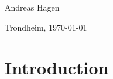 \documentclass[a4paper]{book}
\newcommand{\thesisAuthor}{Andreas Hagen}
\begin{document}
\hfill \thesisAuthor

\hfill Trondheim, \today

\clearpage

\tableofcontents



\mainmatter

\chapter{Introduction}
\label{cha:Introduction}



\end{document}
